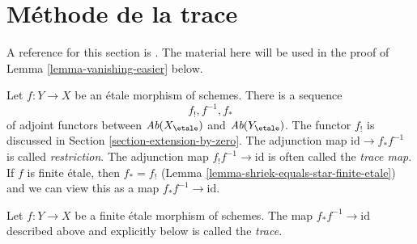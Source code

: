 \section{M\'ethode de la trace}
\label{section-trace-method}

\noindent
A reference for this section is \cite[Expos\'e IX, \S 5]{SGA4}.
The material here will be used in the proof of
Lemma \ref{lemma-vanishing-easier} below.

\medskip\noindent
Let $f : Y \to X$ be an \'etale morphism of schemes. There
is a sequence
$$
f_!, f^{-1}, f_*
$$
of adjoint functors between
$\textit{Ab}(X_\etale)$ and $\textit{Ab}(Y_\etale)$.
The functor $f_!$ is discussed in Section \ref{section-extension-by-zero}.
The adjunction map $\text{id} \to f_* f^{-1}$ is called {\it restriction}.
The adjunction map $f_! f^{-1} \to \text{id}$ is often
called the {\it trace map}. If $f$ is finite \'etale, then $f_* = f_!$
(Lemma \ref{lemma-shriek-equals-star-finite-etale}) and
we can view this as a map $f_*f^{-1} \to \text{id}$.

\begin{definition}
\label{definition-trace-map}
Let $f : Y \to X$ be a finite \'etale morphism of schemes.
The map $f_* f^{-1} \to \text{id}$ described above and explicitly below
is called the {\it trace}.
\end{definition}

